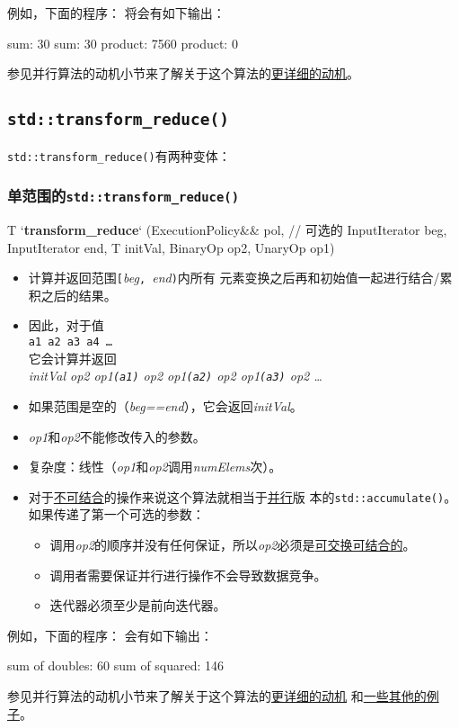 例如，下面的程序：
将会有如下输出：
\begin{blacklisting}
    sum: 30
    sum: 30
    product: 7560
    product: 0
\end{blacklisting}
参见并行算法的动机小节来了解关于这个算法的\hyperref[ch22.6.1]{更详细的动机}。

\subsection{\texttt{std::transform\_reduce()}}\label{ch23.2.2}
\texttt{std::transform\_reduce()}有两种变体：

\subsubsection{单范围的\texttt{std::transform\_reduce()}}
\begin{algolisting}
T
`\textbf{transform\_reduce}` (ExecutionPolicy&& pol,    // 可选的
                  InputIterator beg, InputIterator end,
                  T initVal,
                  BinaryOp op2, UnaryOp op1)
\end{algolisting}
\begin{itemize}
    \item 计算并返回范围\texttt{[}\emph{beg}\texttt{, }\emph{end}\texttt{)}内所有
    元素变换之后再和初始值一起进行结合/累积之后的结果。
    \item 因此，对于值\\
    \hspace*{2em}\texttt{a1 a2 a3 a4 \ldots}\\
    它会计算并返回\\
    \hspace*{2em}\emph{initVal op2 op1\texttt{(a1)} op2 op1\texttt{(a2)} op2 op1\texttt{(a3)} op2 \ldots}
    \item 如果范围是空的（\emph{beg==end}），它会返回\emph{initVal}。
    \item \emph{op1}和\emph{op2}不能修改传入的参数。
    \item 复杂度：线性（\emph{op1}和\emph{op2}调用\emph{numElems}次）。
    \item 对于\hyperref[ch22.6.1.3]{不可结合}的操作来说这个算法就相当于\hyperref[ch22]{并行}版
    本的\texttt{std::accumulate()}。如果传递了第一个可选的参数：
    \begin{itemize}
        \item 调用\emph{op2}的顺序并没有任何保证，所以\emph{op2}必须是\hyperref[ch22.6.1.1]{可交换可结合的}。
        \item 调用者需要保证并行进行操作不会导致数据竞争。
        \item 迭代器必须至少是前向迭代器。
    \end{itemize}
\end{itemize}
例如，下面的程序：
会有如下输出：
\begin{blacklisting}
    sum of doubles: 60
    sum of squared: 146
\end{blacklisting}
参见并行算法的动机小节来了解关于这个算法的\hyperref[transform动机]{更详细的动机}
和\hyperref[ch22.6.1.4]{一些其他的例子}。


